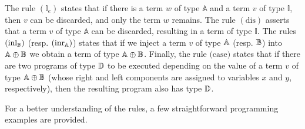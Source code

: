 The rule $(\mathbb{I}_e)$ states that if there is a term $w$ of type $\mathbb{A}$ and a term $v$ of type $\mathbb{I}$, then $v$ can be discarded, and only the term $w$ remains. 
The rule $(\text{dis})$ asserts that a term $v$ of type $\mathbb{A}$ can be discarded, resulting in a term of type $\mathbb{I}$. The rules $(\text{inl}_{\mathbb{B}})$ (resp. $(\text{inr}_{\mathbb{A}})$) states that if we inject a term $v$ of type $\mathbb{A}$ (resp. $\mathbb{B}$) into $\mathbb{A} \oplus \mathbb{B}$ we obtain a term of type $\mathbb{A} \oplus \mathbb{B}$. 
Finally, the rule $\text{(case)}$ states that if there are two programs of type $\mathbb{D}$ to be executed depending on the value of a term $v$ of type $\mathbb{A} \oplus \mathbb{B}$ (whose right and left components are assigned to variables $x$ and $y$, respectively), then the resulting program also has type $\mathbb{D}$.


For a better understanding of the rules, a few straightforward programming examples are provided.  

